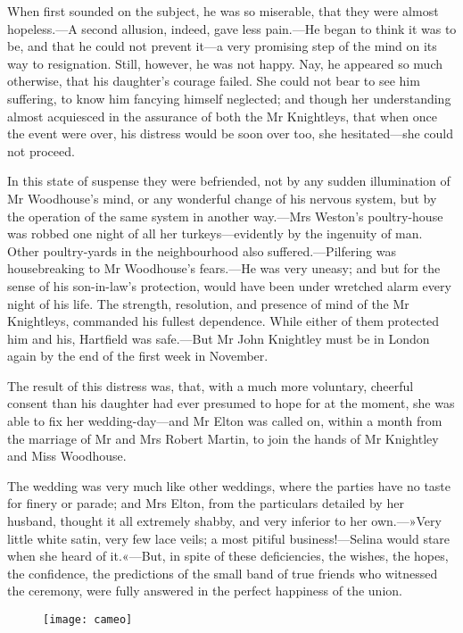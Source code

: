 When first sounded on the subject, he was so miserable, that they were almost hopeless.—A second allusion, indeed, gave less pain.—He began to think it was to be, and that he could not prevent it—a very promising step of the mind on its way to resignation. Still, however, he was not happy. Nay, he appeared so much otherwise, that his daughter's courage failed. She could not bear to see him suffering, to know him fancying himself neglected; and though her understanding almost acquiesced in the assurance of both the Mr Knightleys, that when once the event were over, his distress would be soon over too, she hesitated—she could not proceed.

In this state of suspense they were befriended, not by any sudden illumination of Mr Woodhouse's mind, or any wonderful change of his nervous system, but by the operation of the same system in another way.—Mrs Weston's poultry-house was robbed one night of all her turkeys—evidently by the ingenuity of man. Other poultry-yards in the neighbourhood also suffered.—Pilfering was housebreaking to Mr Woodhouse's fears.—He was very uneasy; and but for the sense of his son-in-law's protection, would have been under wretched alarm every night of his life. The strength, resolution, and presence of mind of the Mr Knightleys, commanded his fullest dependence. While either of them protected him and his, Hartfield was safe.—But Mr John Knightley must be in London again by the end of the first week in November.

The result of this distress was, that, with a much more voluntary, cheerful consent than his daughter had ever presumed to hope for at the moment, she was able to fix her wedding-day—and Mr Elton was called on, within a month from the marriage of Mr and Mrs Robert Martin, to join the hands of Mr Knightley and Miss Woodhouse.

The wedding was very much like other weddings, where the parties have no taste for finery or parade; and Mrs Elton, from the particulars detailed by her husband, thought it all extremely shabby, and very inferior to her own.—»Very little white satin, very few lace veils; a most pitiful business!—Selina would stare when she heard of it.«—But, in spite of these deficiencies, the wishes, the hopes, the confidence, the predictions of the small band of true friends who witnessed the ceremony, were fully answered in the perfect happiness of the union.

\vfill
\begin{figure}[bh]
\centering
\texttt{[image: cameo]}
\end{figure}
